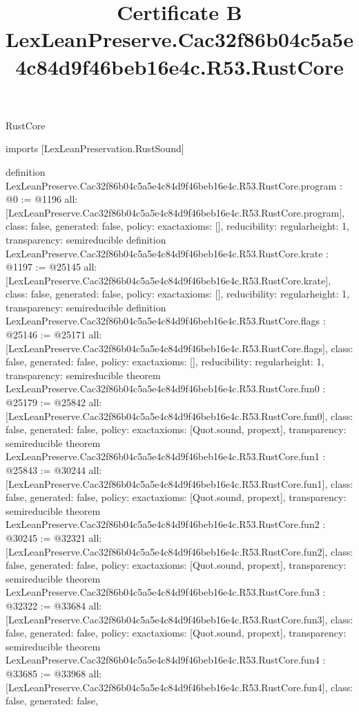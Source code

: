 \begin{lexlean}{RustCore}
\title{Certificate B LexLeanPreserve.Cac32f86b04c5a5e4c84d9f46beb16e4c.R53.RustCore}
\begin{coremodule}
imports [LexLeanPreservation.RustSound]

definition LexLeanPreserve.Cac32f86b04c5a5e4c84d9f46beb16e4c.R53.RustCore.program : @0 := @1196 {
  all: [LexLeanPreserve.Cac32f86b04c5a5e4c84d9f46beb16e4c.R53.RustCore.program],
  class: false,
  generated: false,
  policy: exact{axioms: []},
  reducibility: regular{height: 1},
  transparency: semireducible
}
definition LexLeanPreserve.Cac32f86b04c5a5e4c84d9f46beb16e4c.R53.RustCore.krate : @1197 := @25145 {
  all: [LexLeanPreserve.Cac32f86b04c5a5e4c84d9f46beb16e4c.R53.RustCore.krate],
  class: false,
  generated: false,
  policy: exact{axioms: []},
  reducibility: regular{height: 1},
  transparency: semireducible
}
definition LexLeanPreserve.Cac32f86b04c5a5e4c84d9f46beb16e4c.R53.RustCore.flags : @25146 := @25171 {
  all: [LexLeanPreserve.Cac32f86b04c5a5e4c84d9f46beb16e4c.R53.RustCore.flags],
  class: false,
  generated: false,
  policy: exact{axioms: []},
  reducibility: regular{height: 1},
  transparency: semireducible
}
theorem LexLeanPreserve.Cac32f86b04c5a5e4c84d9f46beb16e4c.R53.RustCore.fun0 : @25179 := @25842 {
  all: [LexLeanPreserve.Cac32f86b04c5a5e4c84d9f46beb16e4c.R53.RustCore.fun0],
  class: false,
  generated: false,
  policy: exact{axioms: [Quot.sound, propext]},
  transparency: semireducible
}
theorem LexLeanPreserve.Cac32f86b04c5a5e4c84d9f46beb16e4c.R53.RustCore.fun1 : @25843 := @30244 {
  all: [LexLeanPreserve.Cac32f86b04c5a5e4c84d9f46beb16e4c.R53.RustCore.fun1],
  class: false,
  generated: false,
  policy: exact{axioms: [Quot.sound, propext]},
  transparency: semireducible
}
theorem LexLeanPreserve.Cac32f86b04c5a5e4c84d9f46beb16e4c.R53.RustCore.fun2 : @30245 := @32321 {
  all: [LexLeanPreserve.Cac32f86b04c5a5e4c84d9f46beb16e4c.R53.RustCore.fun2],
  class: false,
  generated: false,
  policy: exact{axioms: [Quot.sound, propext]},
  transparency: semireducible
}
theorem LexLeanPreserve.Cac32f86b04c5a5e4c84d9f46beb16e4c.R53.RustCore.fun3 : @32322 := @33684 {
  all: [LexLeanPreserve.Cac32f86b04c5a5e4c84d9f46beb16e4c.R53.RustCore.fun3],
  class: false,
  generated: false,
  policy: exact{axioms: [Quot.sound, propext]},
  transparency: semireducible
}
theorem LexLeanPreserve.Cac32f86b04c5a5e4c84d9f46beb16e4c.R53.RustCore.fun4 : @33685 := @33968 {
  all: [LexLeanPreserve.Cac32f86b04c5a5e4c84d9f46beb16e4c.R53.RustCore.fun4],
  class: false,
  generated: false,
}
\end{coremodule}
\end{lexlean}
